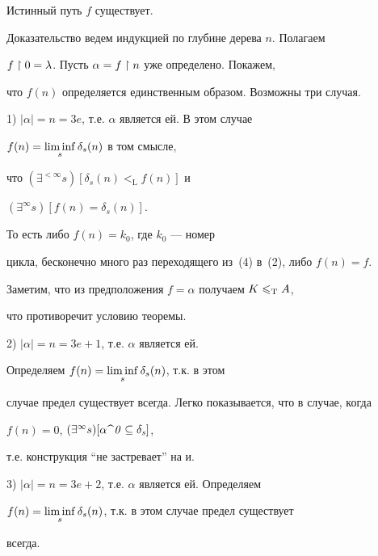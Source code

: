 \begin{lth}


Истинный путь $f$ существует.


\end{lth}





\begin{pf}


Доказательство ведем индукцией по глубине дерева $n$. Полагаем 


$f\restriction 0=\lambda$. Пусть $\alpha=f\restriction n$ уже определено. Покажем,


что $f(n)$ определяется единственным образом. Возможны три случая.





1) $|\alpha|=n=3e$, т.е. $\alpha$ является ей. В этом случае 


$f(n)=\limi\limits_s \delta_s(n)$ в том смысле,


что $(\exists^{<\infty}s)[\delta_s(n)<_{\mathrm L}f(n)]$ и


$(\exists^{\infty}s)[f(n)=\delta_s(n)]$.


То есть либо $f(n)=k_0$, где $k_0$ --- номер


цикла, бесконечно много раз переходящего из~(4) в~(2), либо $f(n)=f$. 


Заметим, что из предположения $f=\alpha$ получаем $K\leqslant_{\mathrm T}A$,


что противоречит условию теоремы. 


 


2) $|\alpha|=n=3e+1$, т.е. $\alpha$ является ей.


Определяем $f(n)=\limi\limits_s\delta_s(n)$, т.к. в этом


случае предел существует всегда. Легко показывается, что в случае, когда


$f(n)=0$, $(\exists^{\infty}s)[\alpha\,\widehat{\ }\,\it 0\subseteq \delta_s]$,


т.е. конструкция ``не застревает'' на и.





3) $|\alpha|=n=3e+2$, т.е. $\alpha$ является ей. Определяем 


$f(n)=\limi\limits_s\delta_s(n)$, т.к. в этом случае предел существует


всегда.


\end{pf}


